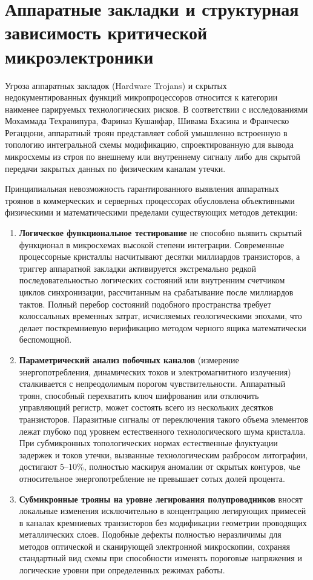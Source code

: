 \documentclass[12pt,a4paper]{article}
\begin{document}
\section{Аппаратные закладки и структурная зависимость критической микроэлектроники}

Угроза аппаратных закладок (Hardware Trojans) и скрытых 
недокументированных функций микропроцессоров относится к 
категории наименее парируемых технологических рисков. В 
соответствии с исследованиями Мохаммада Техранипура, Фариназ Кушанфар, 
Шивама Бхасина и Франческо Регаццони, аппаратный троян представляет 
собой умышленно встроенную в топологию интегральной схемы модификацию, 
спроектированную для вывода микросхемы из строя по внешнему или 
внутреннему сигналу либо для скрытой передачи закрытых данных по 
физическим каналам утечки.

Принципиальная невозможность гарантированного выявления аппаратных троянов в коммерческих и серверных процессорах обусловлена объективными физическими и математическими пределами существующих методов детекции:
\begin{enumerate}[leftmargin=2em, itemsep=0.3em]
    \item \textbf{Логическое функциональное тестирование} не способно 
    выявить скрытый функционал в микросхемах высокой степени интеграции. 
    Современные процессорные кристаллы насчитывают десятки миллиардов 
    транзисторов, а триггер аппаратной закладки активируется 
    экстремально редкой последовательностью логических состояний или 
    внутренним счетчиком циклов синхронизации, рассчитанным на 
    срабатывание после миллиардов тактов. Полный перебор состояний 
    подобного пространства требует колоссальных временных затрат, 
    исчисляемых геологическими эпохами, что делает посткремниевую 
    верификацию методом черного ящика математически беспомощной.
    \item \textbf{Параметрический анализ побочных каналов} (измерение 
    энергопотребления, динамических токов и электромагнитного излучения) 
    сталкивается с непреодолимым порогом чувствительности. Аппаратный 
    троян, способный перехватить ключ шифрования или отключить 
    управляющий регистр, может состоять всего из нескольких десятков 
    транзисторов. Паразитные сигналы от переключения такого объема 
    элементов лежат глубоко под уровнем естественного технологического 
    шума кристалла. При субмикронных топологических нормах естественные 
    флуктуации задержек и токов утечки, вызванные технологическим 
    разбросом литографии, достигают $5\text{--}10\%$, полностью маскируя 
    аномалии от скрытых контуров, чье относительное энергопотребление не 
    превышает сотых долей процента.
    \item \textbf{Субмикронные трояны на уровне легирования 
    полупроводников} вносят локальные изменения 
    исключительно в концентрацию легирующих примесей в каналах 
    кремниевых транзисторов без модификации геометрии проводящих 
    металлических слоев. Подобные дефекты полностью неразличимы для 
    методов оптической и сканирующей электронной микроскопии, сохраняя 
    стандартный вид схемы при способности изменять пороговые напряжения 
    и логические уровни при определенных режимах работы.
\end{enumerate}
\end{document}
